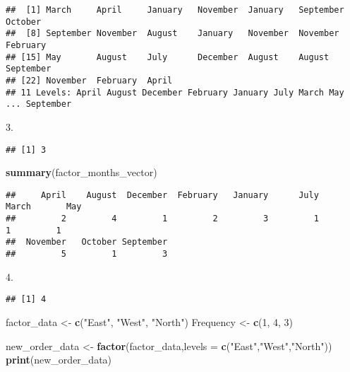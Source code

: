 \documentclass[
]{article}
\newenvironment{Shaded}{\begin{snugshade}}{\end{snugshade}}
\newcommand{\AttributeTok}[1]{\textcolor[rgb]{0.13,0.29,0.53}{#1}}
\newcommand{\DecValTok}[1]{\textcolor[rgb]{0.00,0.00,0.81}{#1}}
\newcommand{\FloatTok}[1]{\textcolor[rgb]{0.00,0.00,0.81}{#1}}
\newcommand{\FunctionTok}[1]{\textcolor[rgb]{0.13,0.29,0.53}{\textbf{#1}}}
\newcommand{\NormalTok}[1]{#1}
\newcommand{\OtherTok}[1]{\textcolor[rgb]{0.56,0.35,0.01}{#1}}
\newcommand{\StringTok}[1]{\textcolor[rgb]{0.31,0.60,0.02}{#1}}
\begin{document}
\begin{verbatim}
##  [1] March     April     January   November  January   September October  
##  [8] September November  August    January   November  November  February 
## [15] May       August    July      December  August    August    September
## [22] November  February  April    
## 11 Levels: April August December February January July March May ... September
\end{verbatim}

\begin{Shaded}
\begin{Highlighting}[]
\FloatTok{3.}
\end{Highlighting}
\end{Shaded}

\begin{verbatim}
## [1] 3
\end{verbatim}

\begin{Shaded}
\begin{Highlighting}[]
\FunctionTok{summary}\NormalTok{(factor\_months\_vector)}
\end{Highlighting}
\end{Shaded}

\begin{verbatim}
##     April    August  December  February   January      July     March       May 
##         2         4         1         2         3         1         1         1 
##  November   October September 
##         5         1         3
\end{verbatim}

\begin{Shaded}
\begin{Highlighting}[]
\FloatTok{4.}
\end{Highlighting}
\end{Shaded}

\begin{verbatim}
## [1] 4
\end{verbatim}

\begin{Shaded}
\begin{Highlighting}[]
\NormalTok{  factor\_data }\OtherTok{\textless{}{-}} \FunctionTok{c}\NormalTok{(}\StringTok{"East"}\NormalTok{, }\StringTok{"West"}\NormalTok{, }\StringTok{"North"}\NormalTok{)}
\NormalTok{  Frequency }\OtherTok{\textless{}{-}} \FunctionTok{c}\NormalTok{(}\DecValTok{1}\NormalTok{, }\DecValTok{4}\NormalTok{, }\DecValTok{3}\NormalTok{)}

\NormalTok{new\_order\_data }\OtherTok{\textless{}{-}} \FunctionTok{factor}\NormalTok{(factor\_data,}\AttributeTok{levels =} \FunctionTok{c}\NormalTok{(}\StringTok{"East"}\NormalTok{,}\StringTok{"West"}\NormalTok{,}\StringTok{"North"}\NormalTok{))}
\FunctionTok{print}\NormalTok{(new\_order\_data)}
\end{Highlighting}
\end{Shaded}
\end{document}
